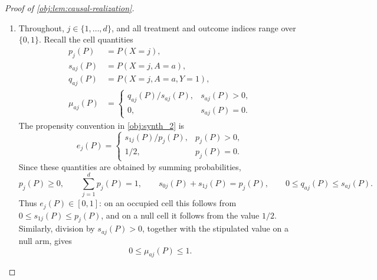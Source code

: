 \documentclass[11pt]{article}
\begin{document}
\begin{proof}[Proof of \cref{obj:lem:causal-realization}]
\begin{enumerate}
\item
Throughout, \(j\in\{1,\ldots,d\}\), and all treatment and outcome indices range over \(\{0,1\}\). Recall the cell quantities
\[
\begin{aligned}
p_j(P)&=P(X=j),\\
s_{aj}(P)&=P(X=j,A=a),\\
q_{aj}(P)&=P(X=j,A=a,Y=1),\\
\mu_{aj}(P)&=
\begin{cases}
q_{aj}(P)/s_{aj}(P),&s_{aj}(P)>0,\\
0,&s_{aj}(P)=0.
\end{cases}
\end{aligned}
\]
The propensity convention in \cref{obj:synth_2} is
\[
e_j(P)=
\begin{cases}
s_{1j}(P)/p_j(P),&p_j(P)>0,\\
1/2,&p_j(P)=0.
\end{cases}
\]
Since these quantities are obtained by summing probabilities,
\[
p_j(P)\ge0,\qquad
\sum_{j=1}^{d}p_j(P)=1,\qquad
s_{0j}(P)+s_{1j}(P)=p_j(P),\qquad
0\le q_{aj}(P)\le s_{aj}(P).
\]
Thus \(e_j(P)\in[0,1]\): on an occupied cell this follows from
\(0\le s_{1j}(P)\le p_j(P)\), and on a null cell it follows from the
value \(1/2\). Similarly, division by \(s_{aj}(P)>0\), together with
the stipulated value on a null arm, gives
\[
0\le\mu_{aj}(P)\le1.
\]


\end{enumerate}
\end{proof}
\end{document}
